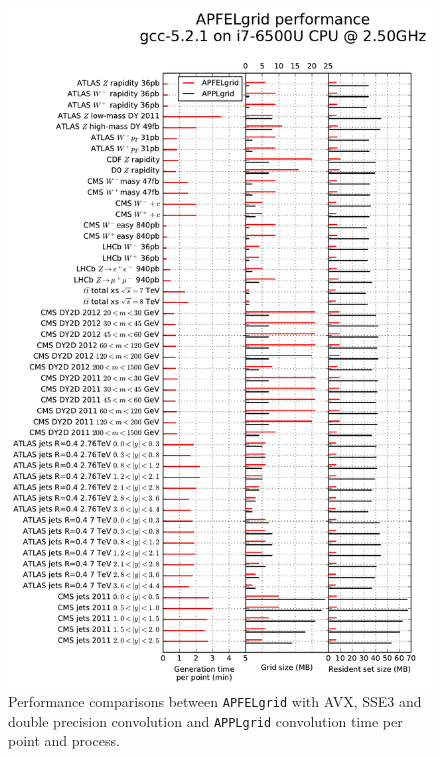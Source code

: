 \documentclass[preprint,12pt]{elsarticle}
\begin{document}
\begin{figure}[ph]
  \centering                                      
  \includegraphics[scale=0.5]{plots/t0b}
\caption{\small Performance comparisons between {\tt APFELgrid} with
  AVX, SSE3 and double precision convolution and {\tt APPLgrid}
  convolution time per point and process.}
\label{fig:benchmark}
\end{figure}



\end{document}
